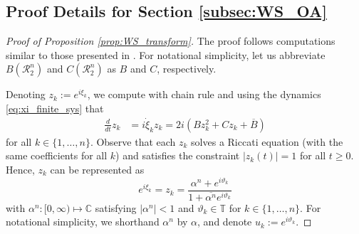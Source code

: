 \documentclass[10pt]{article}
\theoremstyle{definition}
\theoremstyle{definition}
\numberwithin{equation}{section}
\newcommand{\BBC}{\mathbb{C}}
\newcommand{\BBT}{\mathbb{T}}
\newcommand{\CR}{\mathcal{R}}
\newcommand{\Dxi}{\Dot{\xi}}
\begin{document}
\subsection{Proof Details for Section \ref{subsec:WS_OA}}
\label{app:WS_OA}

\begin{proof}[Proof of Proposition \ref{prop:WS_transform}]
    The proof follows computations similar to those presented in \cite{pikovsky2015dynamics,Gong_2019}.
    For notational simplicity, let us abbreviate $B(\CR_2^n)$ and $C(\CR_2^n)$ as $B$ and $C$, respectively.
    
    Denoting $z_k := e^{i\xi_k}$, we compute with chain rule and using the dynamics \eqref{eq:xi_finite_sys} that
    \begin{equation}\label{eq:riccati_eq}
    \begin{aligned}
    \frac{d}{dt} z_k
    &= i \Dxi_k z_k = 2i \left( B z_k^2 + C z_k + \overline{B} \right)
    \end{aligned}
    \end{equation}
    for all $k \in \{1,\dots,n\}$.
    Observe that each $z_k$ solves a Riccati equation (with the same coefficients for all $k$) and satisfies the constraint $|z_k(t)| = 1$ for all $t \geq 0$.
    Hence, $z_k$ can be represented as
    \begin{equation}\label{eq:theta_vartheta_tf}
    e^{i\xi_k} = z_k = \frac{\alpha^n + e^{i\vartheta_k}}{1 + \overline{\alpha^n} e^{i\vartheta_k}} 
    \end{equation}
    with $\alpha^n: [0, \infty) \mapsto \BBC$ satisfying $|\alpha^n| < 1$ and $\vartheta_k \in \BBT$ for $k \in \{1,\dots,n\}$.
    For notational simplicity, we shorthand $\alpha^n$ by $\alpha$, and denote $u_k := e^{i \vartheta_k}$.
    

\end{proof}
\end{document}
